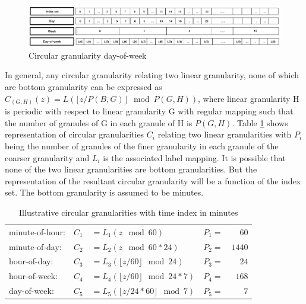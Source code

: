 \documentclass[12pt]{article}
\begin{document}
\begin{figure}

{\centering \includegraphics[width=1\linewidth]{Figs/circular-dow} 

}

\caption{Circular granularity day-of-week}\label{fig:circular-dow}
\end{figure}

In general, any circular granularity relating two linear granularity, none of which are bottom granularity can be expressed as \(C_{(G, H)}(z) = L(\lfloor z/P(B,G) \rfloor\mod P(G,H))\), where linear granularity H is periodic with respect to linear granularity G with regular mapping such that the number of granules of G in each granule of H is \(P(G,H)\). Table \ref{tab:definitions} shows representation of circular granularities \(C_i\) relating two linear granularities with \(P_i\) being the number of granules of the finer granularity in each granule of the coarser granularity and \(L_i\) is the associated label mapping. It is possible that none of the two linear granularities are bottom granularities. But the representation of the resultant circular granularity will be a function of the index set. The bottom granularity is assumed to be minutes.

\begin{table}[ht]
\begin{center}
\begin{tabular}{lr@{~}lr@{~}r}
\toprule
minute-of-hour: & $C_1$ & $= L_1(z \mod 60)$ & $P_1 =$&$60$ \\
minute-of-day: & $C_2$ & $= L_2(z \mod 60*24)$ & $P_2=$&$1440$\\
hour-of-day: & $C_3$ & $= L_3(\lfloor z/60\rfloor\mod 24)$  & $P_3 =$&$24$ \\
hour-of-week: & $C_4$ & $= L_4(\lfloor z/60\rfloor\mod 24*7)$  & $P_4=$&$168$\\
day-of-week: & $C_5$ & $= L_5(\lfloor z/24*60\rfloor \mod 7)$ & $P_5=$&$7$\\
\bottomrule
\end{tabular}
\end{center}
\caption{Illustrative circular granularities with time index in minutes}
\label{tab:definitions}
\end{table}
\end{document}
